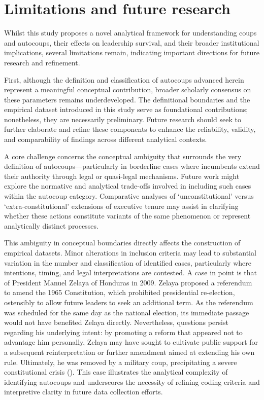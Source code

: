 \documentclass[
  12pt,
]{report}
\begin{document}
\section{Limitations and future
research}\label{limitations-and-future-research}

Whilst this study proposes a novel analytical framework for
understanding coups and autocoups, their effects on leadership survival,
and their broader institutional implications, several limitations
remain, indicating important directions for future research and
refinement.

First, although the definition and classification of autocoups advanced
herein represent a meaningful conceptual contribution, broader scholarly
consensus on these parameters remains underdeveloped. The definitional
boundaries and the empirical dataset introduced in this study serve as
foundational contributions; nonetheless, they are necessarily
preliminary. Future research should seek to further elaborate and refine
these components to enhance the reliability, validity, and comparability
of findings across different analytical contexts.

A core challenge concerns the conceptual ambiguity that surrounds the
very definition of autocoups---particularly in borderline cases where
incumbents extend their authority through legal or quasi-legal
mechanisms. Future work might explore the normative and analytical
trade-offs involved in including such cases within the autocoup
category. Comparative analyses of `unconstitutional' versus
`extra-constitutional' extensions of executive tenure may assist in
clarifying whether these actions constitute variants of the same
phenomenon or represent analytically distinct processes.

This ambiguity in conceptual boundaries directly affects the
construction of empirical datasets. Minor alterations in inclusion
criteria may lead to substantial variation in the number and
classification of identified cases, particularly where intentions,
timing, and legal interpretations are contested. A case in point is that
of President Manuel Zelaya of Honduras in 2009. Zelaya proposed a
referendum to amend the 1965 Constitution, which prohibited presidential
re-election, ostensibly to allow future leaders to seek an additional
term. As the referendum was scheduled for the same day as the national
election, its immediate passage would not have benefited Zelaya
directly. Nevertheless, questions persist regarding his underlying
intent: by promoting a reform that appeared not to advantage him
personally, Zelaya may have sought to cultivate public support for a
subsequent reinterpretation or further amendment aimed at extending his
own rule. Ultimately, he was removed by a military coup, precipitating a
severe constitutional crisis
(). This case illustrates the analytical complexity of identifying
autocoups and underscores the necessity of refining coding criteria and
interpretive clarity in future data collection efforts.
\end{document}
